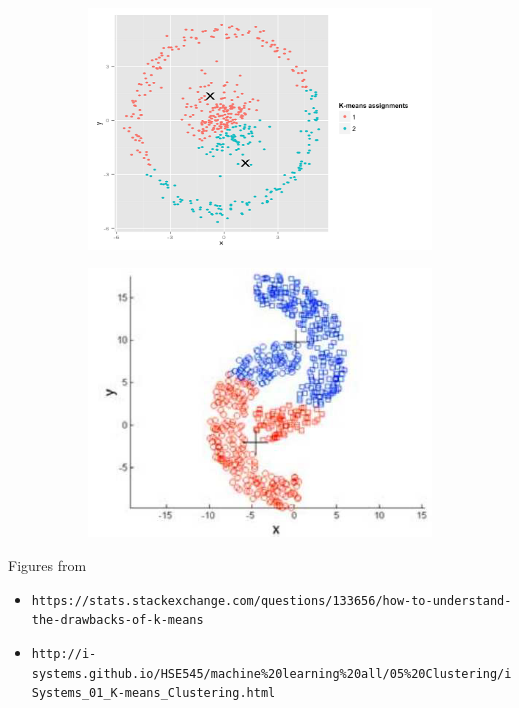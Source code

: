 \documentclass[./some_latex_template.tex]{subfiles}
\begin{document}
\begin{figure}[H]
  \begin{subfigure}[b]{0.6\textwidth}
    \includegraphics[width=\textwidth]{figures/shape.png}
  \end{subfigure}
  \begin{subfigure}[b]{0.4\textwidth}
    \includegraphics[width=\textwidth]{figures/shape2.png}
  \end{subfigure}
\end{figure}

Figures from
\begin{itemize}
	\footnotesize
	\item \texttt{https://stats.stackexchange.com/questions/133656/how-to-understand-the-drawbacks-of-k-means}
	\item \texttt{http://i-systems.github.io/HSE545/machine\%20learning\%20all/05\%20Clustering/iSystems\_01\_K-means\_Clustering.html}
\end{itemize}
\end{document}
